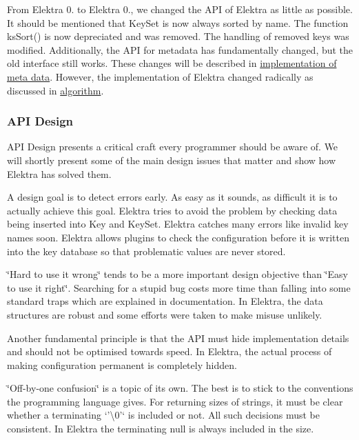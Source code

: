 From Elektra 0. to Elektra 0., we changed the A\+P\+I of Elektra as little as possible. It should be mentioned that {\ttfamily Key\+Set} is now always sorted by name. The function {\ttfamily ks\+Sort()} is now depreciated and was removed. The handling of removed keys was modified. Additionally, the A\+P\+I for metadata has fundamentally changed, but the old interface still works. These changes will be described in \hyperlink{md_doc_help_elektra-meta-data_doc_help_elektra-meta-data_md}{implementation of meta data}. However, the implementation of Elektra changed radically as discussed in \hyperlink{md_doc_help_elektra-algorithm_doc_help_elektra-algorithm_md}{algorithm}.

\subsubsection*{A\+P\+I Design}

A\+P\+I Design presents a critical craft every programmer should be aware of. We will shortly present some of the main design issues that matter and show how Elektra has solved them.

A design goal is to detect errors early. As easy as it sounds, as difficult it is to actually achieve this goal. Elektra tries to avoid the problem by checking data being inserted into {\ttfamily Key} and {\ttfamily Key\+Set}. Elektra catches many errors like invalid key names soon. Elektra allows plugins to check the configuration before it is written into the key database so that problematic values are never stored.

\char`\"{}\+Hard to use it wrong\char`\"{} tends to be a more important design objective than \char`\"{}\+Easy to use it right\char`\"{}. Searching for a stupid bug costs more time than falling into some standard traps which are explained in documentation. In Elektra, the data structures are robust and some efforts were taken to make misuse unlikely.

Another fundamental principle is that the A\+P\+I must hide implementation details and should not be optimised towards speed. In Elektra, the actual process of making configuration permanent is completely hidden.

\char`\"{}\+Off-\/by-\/one confusion\char`\"{} is a topic of its own. The best is to stick to the conventions the programming language gives. For returning sizes of strings, it must be clear whether a terminating `'\textbackslash{}0'` is included or not. All such decisions must be consistent. In Elektra the terminating null is always included in the size.

